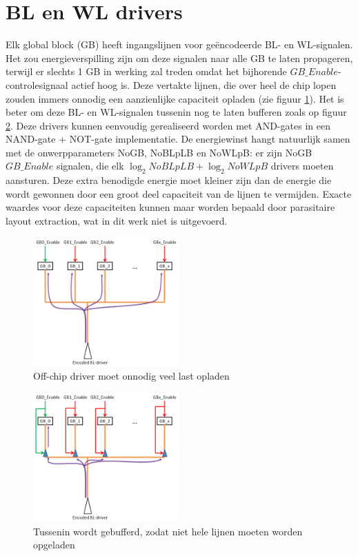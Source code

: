 \section{BL en WL drivers}
Elk global block (GB) heeft ingangslijnen voor geëncodeerde BL- en WL-signalen. Het zou energieverspilling zijn om deze signalen naar alle GB te laten propageren, terwijl er slechts 1 GB in werking zal treden omdat het bijhorende $GB\_{Enable}$-controlesignaal actief hoog is. Deze vertakte lijnen, die over heel de chip lopen zouden immers onnodig een aanzienlijke capaciteit opladen (zie figuur \ref{fig:nodrivers}). Het is beter om deze BL- en WL-signalen tussenin nog te laten bufferen zoals op figuur \ref{fig:drivers}. Deze drivers kunnen eenvoudig gerealiseerd worden met AND-gates in een NAND-gate + NOT-gate implementatie.
De energiewinst hangt natuurlijk samen met de onwerpparameters NoGB, NoBLpLB en NoWLpB: er zijn NoGB $GB\_{Enable}$ signalen, die elk $\log_2 NoBLpLB +\log_2 NoWLpB$ drivers moeten aansturen. Deze extra benodigde energie moet kleiner zijn dan de energie die wordt gewonnen door een groot deel capaciteit van de lijnen te vermijden. Exacte waardes voor deze capaciteiten kunnen maar worden bepaald door parasitaire layout extraction, wat in dit werk niet is uitgevoerd.

\begin{figure}[h!]
  \centering
  \includegraphics[width=0.5\textwidth]{../fig/hfdstk-periphery-nodrivers.png}
  \caption[BL- en WL-drivers]{Off-chip driver moet onnodig veel last opladen}
  \label{fig:nodrivers}
\end{figure}
\begin{figure}[h!]
  \centering
  \includegraphics[width=0.5\textwidth]{../fig/hfdstk-periphery-drivers.png}
  \caption[BL- en WL-drivers]{Tussenin wordt gebufferd, zodat niet hele lijnen moeten worden opgeladen}
  \label{fig:drivers}
\end{figure}

